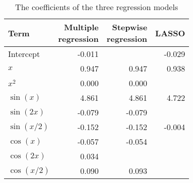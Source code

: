 \begin{table}[!h]

\caption{\label{tab:compare-coefs}The coefficients of the three regression models}
\centering
\begin{tabular}{lrrr}
\toprule
Term & \makecell[r]{Multiple\\regression} & \makecell[r]{Stepwise\\regression} & LASSO\\
\midrule
Intercept & -0.011 &  & -0.029\\
\(x\) & 0.947 & 0.947 & 0.938\\
\(x^2\) & 0.000 & 0.000 & \\
\(\sin(x)\) & 4.861 & 4.861 & 4.722\\
\(\sin(2x)\) & -0.079 & -0.079 & \\
\(\sin(x/2)\) & -0.152 & -0.152 & -0.004\\
\(\cos(x)\) & -0.057 & -0.054 & \\
\(\cos(2x)\) & 0.034 &  & \\
\(\cos(x/2)\) & 0.090 & 0.093 & \\
\bottomrule
\end{tabular}
\end{table}